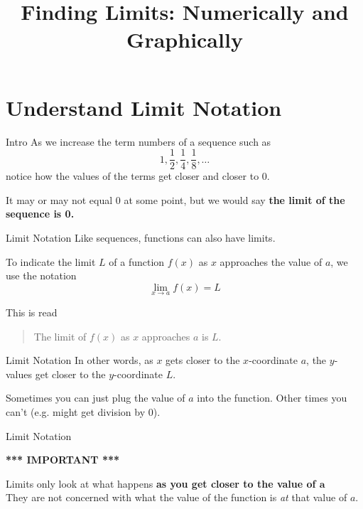 \documentclass[t]{beamer}
\title{Finding Limits: Numerically and Graphically}
\author{}
\date{}
\begin{document}
\begin{frame}{}
    \maketitle
\end{frame}

\section{Understand Limit Notation}

\begin{frame}{Intro}
As we increase the term numbers of a sequence such as
    \[
    1, \frac{1}{2}, \frac{1}{4}, \frac{1}{8}, \dots
    \]
    notice how the values of the terms get closer and closer to 0.   \newline\\  \pause
    
It \alert{may or may not equal 0} at some point, but we would say {\color{blue}\textbf{the limit of the sequence is 0.}}
\end{frame}

\begin{frame}{Limit Notation}
Like sequences, functions can also have limits. \newline\\  \pause
    
To indicate the limit $L$ of a function $f(x)$ as $x$ approaches the value of $a$, we use the notation
\[
\lim_{x \to a} f(x) = L
\]
\pause

This is read    \newline\\
\begin{quote}
    The limit of $f(x)$ as $x$ approaches $a$ is $L$.
\end{quote}
\end{frame}

\begin{frame}{Limit Notation}
    In other words, as $x$ gets closer to the $x$-coordinate $a$, the $y$-values get closer to the $y$-coordinate $L$.   \newline\\        \pause
    
    Sometimes you can just plug the value of $a$ into the function. Other times you can't (e.g. might get division by 0).  
\end{frame}

\begin{frame}{Limit Notation}
\begin{center}
    {\color{red}\Huge{\textbf{*** IMPORTANT ***}}}
\end{center}    

Limits only look at what happens {\color{blue}\textbf{as you get closer to the value of $\bm{a}$}}   \newline\\

They \alert{are not concerned with} what the value of the function is \emph{at} that value of $a$.
\end{frame}
\end{document}
